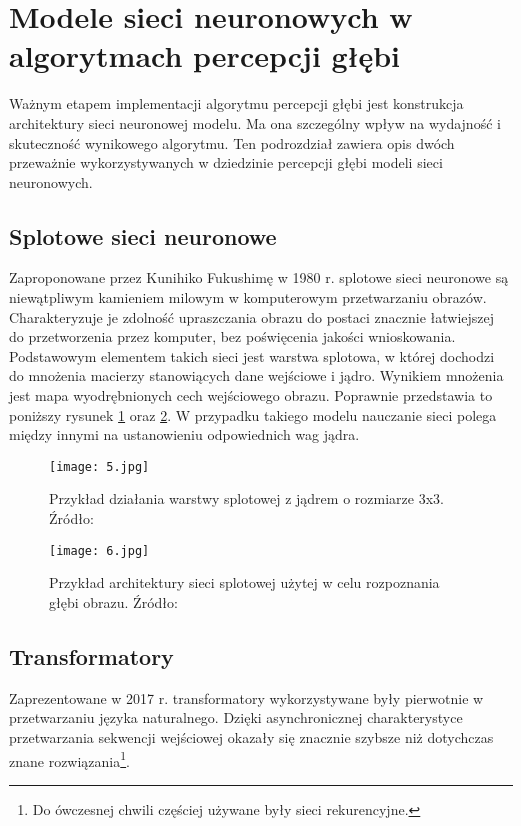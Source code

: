 \section{Modele sieci neuronowych w algorytmach percepcji głębi}
Ważnym etapem implementacji algorytmu percepcji głębi jest konstrukcja architektury sieci neuronowej modelu. Ma ona szczególny wpływ na wydajność i skuteczność wynikowego algorytmu. Ten podrozdział zawiera opis dwóch przeważnie wykorzystywanych w dziedzinie percepcji głębi modeli sieci neuronowych.
\subsection{Splotowe sieci neuronowe}
Zaproponowane przez Kunihiko Fukushimę w 1980 r. \cite{fukushima1980} splotowe sieci neuronowe są niewątpliwym kamieniem milowym w komputerowym przetwarzaniu obrazów. Charakteryzuje je zdolność upraszczania obrazu do postaci znacznie łatwiejszej do przetworzenia przez komputer, bez poświęcenia jakości wnioskowania. Podstawowym elementem takich sieci jest warstwa splotowa, w której dochodzi do mnożenia macierzy stanowiących dane wejściowe i jądro. Wynikiem mnożenia jest mapa wyodrębnionych cech wejściowego obrazu. Poprawnie przedstawia to poniższy rysunek \ref{fig:warstwa-splotowa} oraz \ref{fig:warstwa-splotowa-arch}. W przypadku takiego modelu nauczanie sieci polega między innymi na ustanowieniu odpowiednich wag jądra.
\begin{figure}[H]
    \centering
    \texttt{[image: 5.jpg]}
    \caption{Przykład działania warstwy splotowej z jądrem o rozmiarze 3x3. Źródło: \cite{dumoulin2018}}
    \label{fig:warstwa-splotowa}
\end{figure}
\begin{figure}[H]
    \centering
    \texttt{[image: 6.jpg]}
    \caption{Przykład architektury sieci splotowej użytej w celu rozpoznania głębi obrazu. Źródło: \cite{dong2022}}
    \label{fig:warstwa-splotowa-arch}
\end{figure}

\subsection{Transformatory}
Zaprezentowane w 2017 r. \cite{vaswani2017} transformatory wykorzystywane były pierwotnie w przetwarzaniu języka naturalnego. Dzięki asynchronicznej charakterystyce przetwarzania sekwencji wejściowej okazały się znacznie szybsze niż dotychczas znane rozwiązania\footnote{Do ówczesnej chwili częściej używane były sieci rekurencyjne.}.

